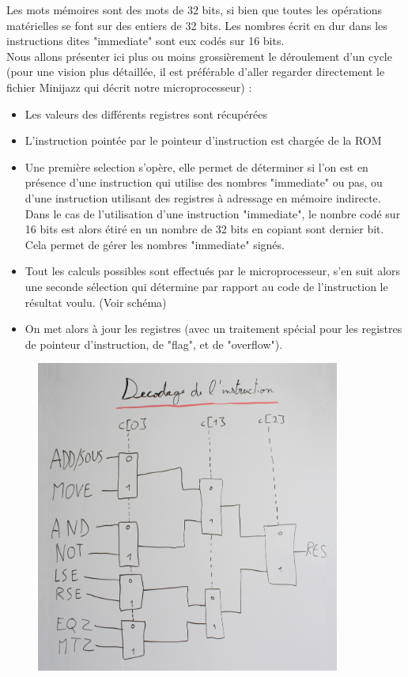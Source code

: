 \documentclass[a4paper, 12pt, twoside]{report}
\begin{document}
Les mots mémoires sont des mots de 32 bits, si bien que toutes les opérations matérielles
se font sur des entiers de 32 bits. Les nombres écrit en dur dans les instructions dites 
"immediate" sont eux codés sur 16 bits.\\


Nous allons présenter ici plus ou moins grossièrement le déroulement d'un cycle (pour une vision 
plus détaillée, il est préférable d'aller regarder directement le fichier Minijazz qui 
décrit notre microprocesseur) :

\begin{itemize}
\item Les valeurs des différents registres sont récupérées
\item L'instruction pointée par le pointeur d'instruction est chargée de la ROM
\item Une première selection s'opère, elle permet de déterminer si l'on est en 
      présence d'une instruction qui utilise des nombres "immediate" ou pas, ou 
      d'une instruction utilisant des registres à adressage en mémoire indirecte.
      Dans le cas de l'utilisation d'une instruction "immediate", le nombre codé 
      sur 16 bits est alors étiré en un nombre de 32 bits en copiant sont dernier 
      bit. Cela permet de gérer les nombres "immediate" signés.
\item Tout les calculs possibles sont effectués par le microprocesseur, s'en suit 
      alors une seconde sélection qui détermine par rapport au code de l'instruction 
      le résultat voulu. (Voir schéma)
\item On met alors à jour les registres (avec un traitement spécial pour les registres 
      de pointeur d'instruction, de "flag", et de "overflow").\\
\end{itemize}

\begin{figure}[!h]
\centering
\includegraphics[width=10cm]{tabnic.jpg}
\end{figure}
\end{document}
